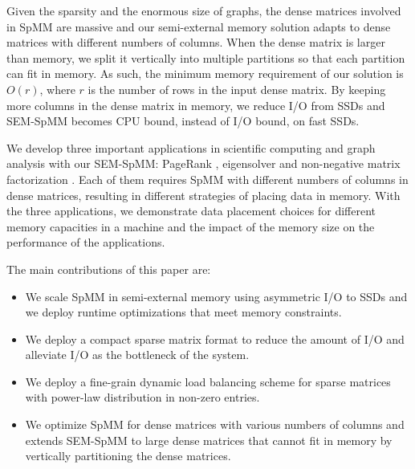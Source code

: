 Given the sparsity and the enormous size of graphs, the dense matrices involved
in SpMM are massive and our semi-external memory solution adapts to
dense matrices with different numbers of columns. When the dense matrix is
larger than memory, we split it
vertically into multiple partitions so that each partition can fit in
memory. As such, the minimum memory requirement of our solution is $O(r)$,
where $r$ is the number of rows in the input dense matrix. By keeping more columns
in the dense matrix in memory, we reduce I/O from SSDs and SEM-SpMM becomes
CPU bound, instead of I/O bound, on fast SSDs.

We develop three important applications in scientific computing and graph
analysis
with our SEM-SpMM: PageRank \cite{pagerank}, eigensolver \cite{anasazi} and
non-negative matrix factorization \cite{nmf}. Each of them requires SpMM with
different numbers of columns in dense matrices, resulting in different
strategies of placing data in memory. With the three applications, we
demonstrate data placement choices for different memory capacities in a machine
and the impact of the memory size on the performance of the applications.


The main contributions of this paper are:
\begin{itemize}
	\item We scale SpMM in semi-external memory using asymmetric I/O to SSDs and we
    deploy runtime optimizations that meet memory constraints.
	\item We deploy a compact sparse matrix format to reduce the amount of
		I/O and alleviate I/O as the bottleneck of the system.
	\item We deploy a fine-grain dynamic load balancing scheme for sparse
		matrices with power-law distribution in non-zero entries.
	\item We optimize SpMM for dense matrices with various numbers of columns
		and extends SEM-SpMM to large dense matrices that cannot fit in memory
		by vertically partitioning the dense matrices.
\end{itemize}

